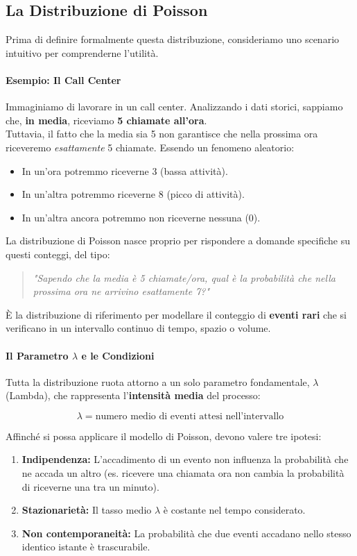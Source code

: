 \subsection{La Distribuzione di Poisson}

Prima di definire formalmente questa distribuzione, consideriamo uno scenario intuitivo per comprenderne l'utilità.

\paragraph{Esempio: Il Call Center}
Immaginiamo di lavorare in un call center. Analizzando i dati storici, sappiamo che, \textbf{in media}, riceviamo \textbf{5 chiamate all'ora}.
\\Tuttavia, il fatto che la media sia 5 non garantisce che nella prossima ora riceveremo \textit{esattamente} 5 chiamate. Essendo un fenomeno aleatorio:
\begin{itemize}
    \item In un'ora potremmo riceverne 3 (bassa attività).
    \item In un'altra potremmo riceverne 8 (picco di attività).
    \item In un'altra ancora potremmo non riceverne nessuna (0).
\end{itemize}

La distribuzione di Poisson nasce proprio per rispondere a domande specifiche su questi conteggi, del tipo:
\begin{quote}
    \textit{"Sapendo che la media è 5 chiamate/ora, qual è la probabilità che nella prossima ora ne arrivino esattamente 7?"}
\end{quote}

È la distribuzione di riferimento per modellare il conteggio di \textbf{eventi rari} che si verificano in un intervallo continuo di tempo, spazio o volume.

\paragraph{Il Parametro $\lambda$ e le Condizioni}
Tutta la distribuzione ruota attorno a un solo parametro fondamentale, $\lambda$ (Lambda), che rappresenta l'\textbf{intensità media} del processo:

\[ \lambda = \text{numero medio di eventi attesi nell'intervallo} \]

Affinché si possa applicare il modello di Poisson, devono valere tre ipotesi:
\begin{enumerate}
    \item \textbf{Indipendenza:} L'accadimento di un evento non influenza la probabilità che ne accada un altro (es. ricevere una chiamata ora non cambia la probabilità di riceverne una tra un minuto).
    \item \textbf{Stazionarietà:} Il tasso medio $\lambda$ è costante nel tempo considerato.
    \item \textbf{Non contemporaneità:} La probabilità che due eventi accadano nello stesso identico istante è trascurabile.
\end{enumerate}

